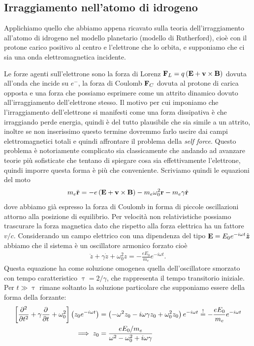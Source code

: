 \subsection{Irraggiamento nell'atomo di idrogeno}
Applichiamo quello che abbiamo appena ricavato sulla teoria dell'irraggiamento all'atomo di idrogeno nel modello planetario (modello di Rutherford), 
cioè con il protone carico positivo al centro e l'elettrone che lo orbita, e supponiamo che ci sia una onda elettromagnetica incidente.

Le forze agenti sull'elettrone sono la forza di Lorenz $ \v{F}_L = q \left( \v{E} + \v{v} \times \v{B} \right) $ dovuta all'onda che incide su $ e^- $, 
la forza di Coulomb $ \v{F}_C $ dovuta al protone di carica opposta e una forza che possiamo esprimere come un attrito dinamico dovuto all'irraggiamento 
dell'elettrone stesso. Il motivo per cui imponiamo che l'irraggiamento dell'elettrone si manifesti come una forza dissipativa è che irraggiando perde 
energia, quindi è del tutto plausibile che sia simile a un attrito, inoltre se non inserissimo questo termine dovremmo farlo uscire dai campi 
elettromagnetici totali e quindi affrontare il problema della \textit{self force}. Questo problema è notoriamente complicato sia classicamente che andando 
ad avanzare teorie più sofisticate che tentano di spiegare cosa sia effettivamente l'elettrone, quindi imporre questa forma è più che conveniente. 
Scriviamo quindi le equazioni del moto
\begin{align}
  m_e \ddot{\v{r}} = -e\left( \v{E} + \v{v} \times \v{B} \right) - m_e \omega_0^2 \v{r} - m_e \gamma \dot{\v{r}}
\end{align}
dove abbiamo già espresso la forza di Coulomb in forma di piccole oscillazioni attorno alla posizione di equilibrio. Per velocità non relativistiche 
possiamo trascurare la forza magnetica dato che rispetto alla forza elettrica ha un fattore $ v/c $. Considerando un campo elettrico con una dipendenza del 
tipo $ \v{E} = E_0 e^{-i\omega t} \vers{z} $ abbiamo che il sistema è un oscillatore armonico forzato cioè
\begin{align}
  \ddot{z} + \gamma \dot{z} + \omega_0^2 z = - \frac{eE_0}{m_e} e^{-i\omega t}.
\end{align}
Questa equazione ha come soluzione omogenea quella dell'oscillatore smorzato con tempo caratteristico $ \uptau = 2/\gamma $, che rappresenta il tempo 
transitorio iniziale. Per $ t \gg \uptau $ rimane soltanto la soluzione particolare che supponiamo essere della forma della forzante:
\begin{align}
  \left[ \der[2]{}{t} + \gamma \der{}{t} + \omega_0^2 \right] \left( z_0 e^{-i\omega t} \right) 
  &= \left( -\omega^2 z_0 -i \omega \gamma z_0 + \omega_0^2 z_0 \right) e^{-i\omega t} \overset{!}{=} - \frac{eE_0}{m_e} e^{-i\omega t}
  \\
  \implies z_0 &= \frac{{eE_0}/{m_e}}{\omega^2 -\omega_0^2 + i\omega \gamma}
\end{align}
